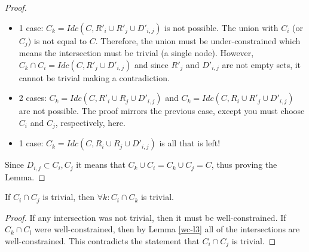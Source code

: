 \begin{proof}
\begin{itemize}
    \item 1 case:  $C_k=Idc(C,R'_i\cup R'_j\cup D'_{i,j})$ is not possible. The union with $C_i$ (or $C_j$) is not equal to $C$. Therefore, the union must be under-constrained which means the intersection must be trivial (a single node). However, $C_k\cap C_i=Idc(C,R'_j\cup D'_{i,j})$ and since $R'_j$ and $D'_{i,j}$ are not empty sets, it cannot be trivial making a contradiction.

    \item 2 cases:  $C_k=Idc(C,R'_i\cup R_j\cup D'_{i,j})$ and $C_k=Idc(C,R_i\cup R'_j\cup D'_{i,j})$ are not possible. The proof mirrors the previous case, except you must choose $C_i$ and $C_j$, respectively, here.

    \item 1 case: $C_k=Idc(C,R_i\cup R_j\cup D'_{i,j})$ is all that is left!
\end{itemize}

Since $D_{i,j}\subset C_i, C_j$ it means that $C_k\cup C_i = C_k \cup C_j = C$, thus proving the Lemma.

\end{proof}








\begin{lemma}\label{uc-l2}
If $C_i\cap C_j$ is trivial, then $\forall k: C_i\cap C_k$ is trivial.
\end{lemma}

\begin{proof}
If any intersection was not trivial, then it must be well-constrained. If $C_k\cap C_l$ were well-constrained, then by Lemma \ref{wc-l3} all of the intersections are well-constrained. This contradicts the statement that $C_i\cap C_j$ is trivial.
\end{proof}



